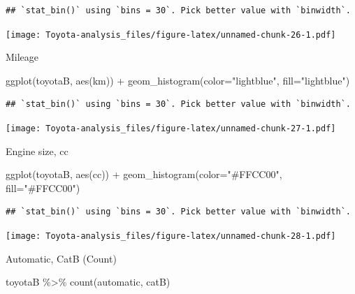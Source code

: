 \documentclass[
]{article}
\newenvironment{Shaded}{\begin{snugshade}}{\end{snugshade}}
\newcommand{\AttributeTok}[1]{\textcolor[rgb]{0.77,0.63,0.00}{#1}}
\newcommand{\FunctionTok}[1]{\textcolor[rgb]{0.00,0.00,0.00}{#1}}
\newcommand{\NormalTok}[1]{#1}
\newcommand{\SpecialCharTok}[1]{\textcolor[rgb]{0.00,0.00,0.00}{#1}}
\newcommand{\StringTok}[1]{\textcolor[rgb]{0.31,0.60,0.02}{#1}}
\begin{document}
\begin{verbatim}
## `stat_bin()` using `bins = 30`. Pick better value with `binwidth`.
\end{verbatim}

\texttt{[image: Toyota-analysis\_files/figure-latex/unnamed-chunk-26-1.pdf]}

Mileage

\begin{Shaded}
\begin{Highlighting}[]
\FunctionTok{ggplot}\NormalTok{(toyotaB, }\FunctionTok{aes}\NormalTok{(km)) }\SpecialCharTok{+} \FunctionTok{geom\_histogram}\NormalTok{(}\AttributeTok{color=}\StringTok{"lightblue"}\NormalTok{, }\AttributeTok{fill=}\StringTok{"lightblue"}\NormalTok{) }
\end{Highlighting}
\end{Shaded}

\begin{verbatim}
## `stat_bin()` using `bins = 30`. Pick better value with `binwidth`.
\end{verbatim}

\texttt{[image: Toyota-analysis\_files/figure-latex/unnamed-chunk-27-1.pdf]}

Engine size, cc

\begin{Shaded}
\begin{Highlighting}[]
\FunctionTok{ggplot}\NormalTok{(toyotaB, }\FunctionTok{aes}\NormalTok{(cc)) }\SpecialCharTok{+} \FunctionTok{geom\_histogram}\NormalTok{(}\AttributeTok{color=}\StringTok{"\#FFCC00"}\NormalTok{, }\AttributeTok{fill=}\StringTok{"\#FFCC00"}\NormalTok{)}
\end{Highlighting}
\end{Shaded}

\begin{verbatim}
## `stat_bin()` using `bins = 30`. Pick better value with `binwidth`.
\end{verbatim}

\texttt{[image: Toyota-analysis\_files/figure-latex/unnamed-chunk-28-1.pdf]}

Automatic, CatB (Count)

\begin{Shaded}
\begin{Highlighting}[]
\NormalTok{toyotaB }\SpecialCharTok{\%\textgreater{}\%} 
  \FunctionTok{count}\NormalTok{(automatic, catB)}
\end{Highlighting}
\end{Shaded}
\end{document}
